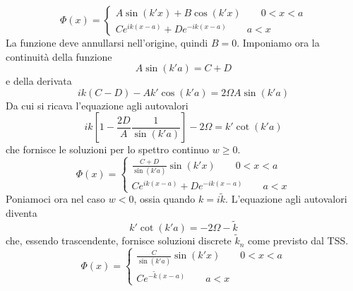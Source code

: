 \documentclass[a4paper]{article}
\begin{document}
        \begin{equation*}
            \Phi(x)=
            \begin{cases}
                A\sin(k'x)+B\cos(k'x) \quad\quad 0<x<a\\
                Ce^{ik(x-a)}+De^{-ik(x-a)} \quad\quad a<x
            \end{cases}
        \end{equation*}
        La funzione deve annullarsi nell'origine, quindi $B=0$.
        Imponiamo ora la continuità della funzione
        \begin{equation*}
            A\sin(k'a)=C+D
        \end{equation*}
        e della derivata
        \begin{equation*}
            ik(C-D)-Ak'\cos(k'a)=2\Omega A\sin(k'a)
        \end{equation*}
        Da cui si ricava l'equazione agli autovalori
        \begin{equation*}
            ik\left[1-\frac{2D}{A}\frac{1}{\sin(k'a)}\right]-2\Omega=k'\cot(k'a)
        \end{equation*}
        che fornisce le soluzioni per lo spettro continuo $w\geq 0$.
        \begin{equation*}
            \Phi(x)=
            \begin{cases}
                \frac{C+D}{\sin(k'a)}\sin(k'x) \quad\quad 0<x<a\\
                Ce^{ik(x-a)}+De^{-ik(x-a)} \quad\quad a<x
            \end{cases}
        \end{equation*}
        Poniamoci ora nel caso $w<0$, ossia quando $k=i\tilde{k}$.
        L'equazione agli autovalori diventa
        \begin{equation*}
            k'\cot(k'a)=-2\Omega-\tilde{k}
        \end{equation*}
        che, essendo trascendente, fornisce soluzioni discrete $\tilde{k}_n$ come previsto dal TSS.
        \begin{equation*}
            \Phi(x)=
            \begin{cases}
                \frac{C}{\sin(k'a)}\sin(k'x) \quad\quad 0<x<a\\
                Ce^{-\tilde{k}(x-a)} \quad\quad a<x
            \end{cases}
        \end{equation*}
\end{document}
